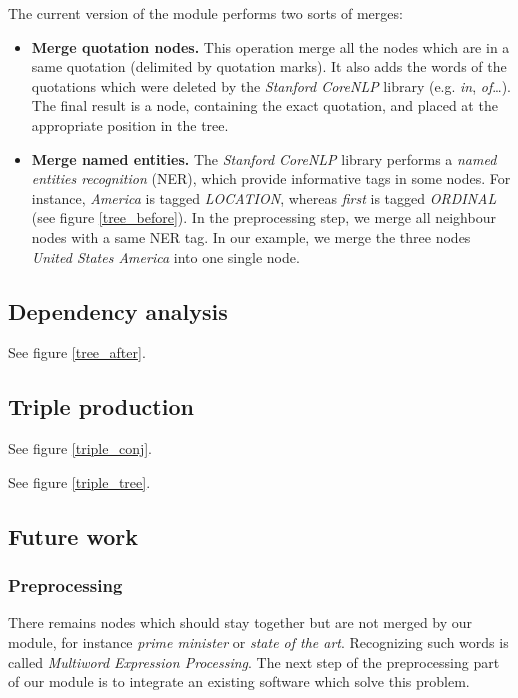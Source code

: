 The current version of the module performs two sorts of merges:
\begin{itemize}
    \item \textbf{Merge quotation nodes.} This operation merge all the nodes which
    are in a same quotation (delimited by quotation marks). It also adds the words
    of the quotations which were deleted by the \emph{Stanford CoreNLP} library
    (e.g. \emph{in}, \emph{of}\dots). The final result is a node, containing the
    exact quotation, and placed at the appropriate position in the tree.
    \item \textbf{Merge named entities.} The \emph{Stanford CoreNLP} library 
    performs a \emph{named entities recognition} (NER), which provide informative 
    tags in some nodes. For instance, \emph{America} is tagged \emph{LOCATION}, 
    whereas \emph{first} is tagged \emph{ORDINAL} (see figure \ref{tree_before}).
    In the preprocessing step, we merge all neighbour nodes with a same NER tag.
    In our example, we merge the three nodes \emph{United States America} into
    one single node.
\end{itemize}

\subsection{Dependency analysis}

See figure \ref{tree_after}.


\subsection{Triple production}

See figure \ref{triple_conj}.

See figure \ref{triple_tree}.


\subsection{Future work}

\subsubsection{Preprocessing}

There remains nodes which should stay together but are not merged by our module,
for instance \emph{prime minister} or \emph{state of the art}. Recognizing such words
is called \emph{Multiword Expression Processing}. The next step of the preprocessing
part of our module is to integrate an existing software which solve this problem.
